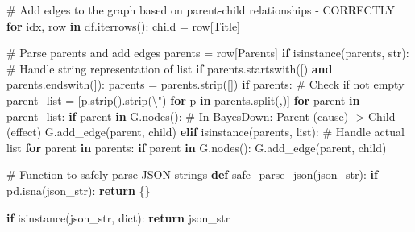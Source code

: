 \documentclass[
  11pt,
  letterpaper,
]{book}
\newenvironment{Shaded}{\begin{snugshade}}{\end{snugshade}}
\newcommand{\BuiltInTok}[1]{\textcolor[rgb]{0.00,0.23,0.31}{#1}}
\newcommand{\CharTok}[1]{\textcolor[rgb]{0.13,0.47,0.30}{#1}}
\newcommand{\CommentTok}[1]{\textcolor[rgb]{0.37,0.37,0.37}{#1}}
\newcommand{\ControlFlowTok}[1]{\textcolor[rgb]{0.00,0.23,0.31}{\textbf{#1}}}
\newcommand{\KeywordTok}[1]{\textcolor[rgb]{0.00,0.23,0.31}{\textbf{#1}}}
\newcommand{\NormalTok}[1]{\textcolor[rgb]{0.00,0.23,0.31}{#1}}
\newcommand{\OperatorTok}[1]{\textcolor[rgb]{0.37,0.37,0.37}{#1}}
\newcommand{\StringTok}[1]{\textcolor[rgb]{0.13,0.47,0.30}{#1}}
\begin{document}
\begin{Shaded}
\begin{Highlighting}[]
  \CommentTok{\# Add edges to the graph based on parent{-}child relationships {-} CORRECTLY}
  \ControlFlowTok{for}\NormalTok{ idx, row }\KeywordTok{in}\NormalTok{ df.iterrows():}
\NormalTok{      child }\OperatorTok{=}\NormalTok{ row[}\StringTok{\textquotesingle{}Title\textquotesingle{}}\NormalTok{]}

      \CommentTok{\# Parse parents and add edges}
\NormalTok{      parents }\OperatorTok{=}\NormalTok{ row[}\StringTok{\textquotesingle{}Parents\textquotesingle{}}\NormalTok{]}
      \ControlFlowTok{if} \BuiltInTok{isinstance}\NormalTok{(parents, }\BuiltInTok{str}\NormalTok{):}
          \CommentTok{\# Handle string representation of list}
          \ControlFlowTok{if}\NormalTok{ parents.startswith(}\StringTok{\textquotesingle{}[\textquotesingle{}}\NormalTok{) }\KeywordTok{and}\NormalTok{ parents.endswith(}\StringTok{\textquotesingle{}]\textquotesingle{}}\NormalTok{):}
\NormalTok{              parents }\OperatorTok{=}\NormalTok{ parents.strip(}\StringTok{\textquotesingle{}[]\textquotesingle{}}\NormalTok{)}
              \ControlFlowTok{if}\NormalTok{ parents:  }\CommentTok{\# Check if not empty}
\NormalTok{                  parent\_list }\OperatorTok{=}\NormalTok{ [p.strip().strip(}\StringTok{\textquotesingle{}}\CharTok{\textbackslash{}\textquotesingle{}}\StringTok{"\textquotesingle{}}\NormalTok{) }\ControlFlowTok{for}\NormalTok{ p }\KeywordTok{in}\NormalTok{ parents.split(}\StringTok{\textquotesingle{},\textquotesingle{}}\NormalTok{)]}
                  \ControlFlowTok{for}\NormalTok{ parent }\KeywordTok{in}\NormalTok{ parent\_list:}
                      \ControlFlowTok{if}\NormalTok{ parent }\KeywordTok{in}\NormalTok{ G.nodes():}
                          \CommentTok{\# In BayesDown: Parent (cause) {-}\textgreater{} Child (effect)}
\NormalTok{                          G.add\_edge(parent, child)}
      \ControlFlowTok{elif} \BuiltInTok{isinstance}\NormalTok{(parents, }\BuiltInTok{list}\NormalTok{):}
          \CommentTok{\# Handle actual list}
          \ControlFlowTok{for}\NormalTok{ parent }\KeywordTok{in}\NormalTok{ parents:}
              \ControlFlowTok{if}\NormalTok{ parent }\KeywordTok{in}\NormalTok{ G.nodes():}
\NormalTok{                  G.add\_edge(parent, child)}

  \CommentTok{\# Function to safely parse JSON strings}
  \KeywordTok{def}\NormalTok{ safe\_parse\_json(json\_str):}
      \ControlFlowTok{if}\NormalTok{ pd.isna(json\_str):}
          \ControlFlowTok{return}\NormalTok{ \{\}}

      \ControlFlowTok{if} \BuiltInTok{isinstance}\NormalTok{(json\_str, }\BuiltInTok{dict}\NormalTok{):}
          \ControlFlowTok{return}\NormalTok{ json\_str}


\end{Highlighting}
\end{Shaded}
\end{document}

